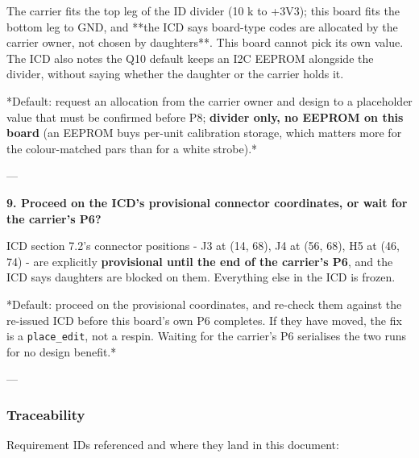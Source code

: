\documentclass[11pt,a4paper]{article}
\begin{document}
The carrier fits the top leg of the ID divider (10 k to +3V3); this board fits the bottom leg to GND, and {*}{*}the ICD says board-type codes are allocated by the carrier owner, not chosen by daughters{*}{*}. This board cannot pick its own value. The ICD also notes the Q10 default keeps an I2C EEPROM alongside the divider, without saying whether the daughter or the carrier holds it.

{*}Default: request an allocation from the carrier owner and design to a placeholder value that must be confirmed before P8; \textbf{divider only, no EEPROM on this board} (an EEPROM buys per-unit calibration storage, which matters more for the colour-matched pars than for a white strobe).{*}

---

\textbf{9. Proceed on the ICD's provisional connector coordinates, or wait for the carrier's P6?}

ICD section 7.2's connector positions - J3 at (14, 68), J4 at (56, 68), H5 at (46, 74) - are explicitly \textbf{provisional until the end of the carrier's P6}, and the ICD says daughters are blocked on them. Everything else in the ICD is frozen.

{*}Default: proceed on the provisional coordinates, and re-check them against the re-issued ICD before this board's own P6 completes. If they have moved, the fix is a \texttt{place\_edit}, not a respin. Waiting for the carrier's P6 serialises the two runs for no design benefit.{*}

---

\subsubsection*{Traceability}
Requirement IDs referenced and where they land in this document:
\end{document}
